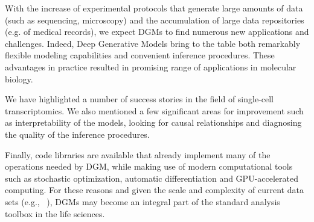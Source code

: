 With the increase of experimental protocols that generate large amounts of data~\cite{Efremova2020} (such as sequencing, microscopy) and the accumulation of large data repositories (e.g. of medical records), we expect DGMs to find numerous new applications and challenges. Indeed, Deep Generative Models bring to the table both remarkably flexible modeling capabilities and convenient inference procedures. These advantages in practice resulted in promising range of applications in molecular biology. 

We have highlighted a number of success stories in the field of single-cell transcriptomics. We also mentioned a few significant areas for improvement such as interpretability of the models, looking for causal relationships and diagnosing the quality of the inference procedures. 

Finally, code libraries are available that already implement many of the operations needed by DGM, while making use of modern computational tools such as stochastic optimization, automatic differentiation and GPU-accelerated computing. For these reasons and given the scale and complexity of current data sets (e.g., ~\cite{regev2017science,davis2018encyclopedia,bento2014chembl}), DGMs may become an integral part of the standard analysis toolbox in the life sciences.




